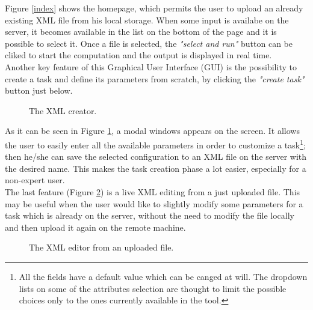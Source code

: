 Figure \ref{index} shows the homepage, which permits the user to upload an already existing XML file from his local storage. When some input is availabe on the server, it becomes available in the list on the bottom of the page and it is possible to select it. Once a file is selected, the \emph{"select and run"} button can be cliked to start the computation and the output is displayed in real time.\\
Another key feature of this Graphical User Interface (GUI) is the possibility to create a task and define its parameters from scratch, by clicking the \emph{"create task"} button just below.

\begin{figure}[H]
  \caption{The XML creator.}
  \label{modal}
\end{figure}  

As it can be seen in Figure \ref{modal}, a modal windows appears on the screen. It allows the user to easily enter all the available parameters in order to customize a task\footnote{All the fields have a default value which can be canged at will. The dropdown lists on some of the attributes selection are thought to limit the possible choices only to the ones currently available in the tool.}; then he/she can save the selected configuration to an XML file on the server with the desired name. This makes the task creation phase a lot easier, especially for a non-expert user.\\
The last feature (Figure \ref{editor}) is a live XML editing from a just uploaded file. This may be useful when the user would like to slightly modify some parameters for a task which is already on the server, without the need to modify the file locally and then upload it again on the remote machine.

\begin{figure}[H]
  \caption{The XML editor from an uploaded file.}
  \label{editor}
\end{figure}  